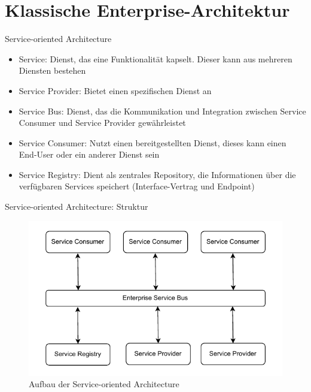 \section{Klassische Enterprise-Architektur}


\begin{frame}{Service-oriented Architecture}
  \begin{itemize}
    \item Service: Dienst, das eine Funktionalität kapselt.
    Dieser kann aus mehreren Diensten bestehen
    \item Service Provider: Bietet einen spezifischen Dienst an
    \item Service Bus: Dienst, das die Kommunikation und Integration zwischen Service Consumer und Service Provider gewährleistet
    \item Service Consumer: Nutzt einen bereitgestellten Dienst, dieses kann einen End-User oder ein anderer Dienst sein
    \item Service Registry: Dient als zentrales Repository, die Informationen über die verfügbaren Services speichert (Interface-Vertrag und Endpoint)
  \end{itemize}
\end{frame}
\begin{frame}{Service-oriented Architecture: Struktur}
  \begin{figure}[!h]
    \centering
    \includegraphics[scale=0.55]{imglib/soa/soa.drawio}
    \caption{Aufbau der Service-oriented Architecture}
    \label{fig:soa}
  \end{figure}
\end{frame}

